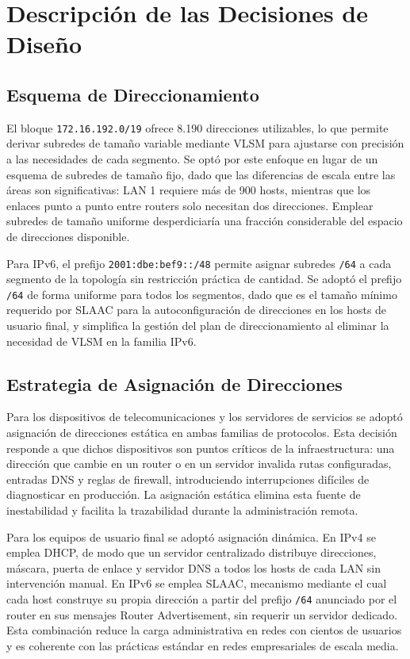 \section{Descripción de las Decisiones de Diseño}

\subsection{Esquema de Direccionamiento}

El bloque \texttt{172.16.192.0/19} ofrece 8.190 direcciones utilizables, lo
que permite derivar subredes de tamaño variable mediante VLSM para ajustarse
con precisión a las necesidades de cada segmento. Se optó por este enfoque
en lugar de un esquema de subredes de tamaño fijo, dado que las diferencias
de escala entre las áreas son significativas: LAN 1 requiere más de 900 hosts,
mientras que los enlaces punto a punto entre routers solo necesitan dos
direcciones. Emplear subredes de tamaño uniforme desperdiciaría una fracción
considerable del espacio de direcciones disponible.

Para IPv6, el prefijo \texttt{2001:dbe:bef9::/48} permite asignar subredes
\texttt{/64} a cada segmento de la topología sin restricción práctica de
cantidad. Se adoptó el prefijo \texttt{/64} de forma uniforme para todos los
segmentos, dado que es el tamaño mínimo requerido por SLAAC para la
autoconfiguración de direcciones en los hosts de usuario final, y simplifica
la gestión del plan de direccionamiento al eliminar la necesidad de VLSM en
la familia IPv6.

\subsection{Estrategia de Asignación de Direcciones}

Para los dispositivos de telecomunicaciones y los servidores de servicios se
adoptó asignación de direcciones estática en ambas familias de protocolos.
Esta decisión responde a que dichos dispositivos son puntos críticos de la
infraestructura: una dirección que cambie en un router o en un servidor
invalida rutas configuradas, entradas DNS y reglas de firewall, introduciendo
interrupciones difíciles de diagnosticar en producción. La asignación estática
elimina esta fuente de inestabilidad y facilita la trazabilidad durante la
administración remota.

Para los equipos de usuario final se adoptó asignación dinámica. En IPv4 se
emplea DHCP, de modo que un servidor centralizado distribuye direcciones,
máscara, puerta de enlace y servidor DNS a todos los hosts de cada LAN sin
intervención manual. En IPv6 se emplea SLAAC, mecanismo mediante el cual
cada host construye su propia dirección a partir del prefijo \texttt{/64}
anunciado por el router en sus mensajes Router Advertisement, sin requerir
un servidor dedicado. Esta combinación reduce la carga administrativa en redes
con cientos de usuarios y es coherente con las prácticas estándar en redes
empresariales de escala media.

